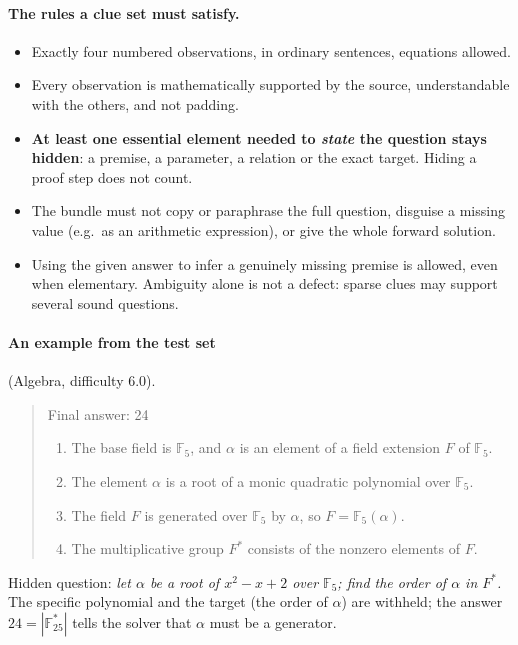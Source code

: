 \documentclass[11pt,a4paper]{article}
\begin{document}
\paragraph{The rules a clue set must satisfy.}
\begin{itemize}
\item Exactly four numbered observations, in ordinary sentences, equations allowed.
\item Every observation is mathematically supported by the source, understandable with the others, and not padding.
\item \textbf{At least one essential element needed to \emph{state} the question stays hidden}: a premise, a parameter, a relation or the exact target. Hiding a proof step does not count.
\item The bundle must not copy or paraphrase the full question, disguise a missing value (e.g.\ as an arithmetic expression), or give the whole forward solution.
\item Using the given answer to infer a genuinely missing premise is allowed, even when elementary. Ambiguity alone is not a defect: sparse clues may support several sound questions.
\end{itemize}

\paragraph{An example from the test set} (Algebra, difficulty 6.0).
\begin{quote}\small
Final answer: 24
\begin{enumerate}[label=\arabic*.]
\item The base field is $\mathbb{F}_5$, and $\alpha$ is an element of a field extension $F$ of $\mathbb{F}_5$.
\item The element $\alpha$ is a root of a monic quadratic polynomial over $\mathbb{F}_5$.
\item The field $F$ is generated over $\mathbb{F}_5$ by $\alpha$, so $F = \mathbb{F}_5(\alpha)$.
\item The multiplicative group $F^*$ consists of the nonzero elements of $F$.
\end{enumerate}
\end{quote}
Hidden question: \emph{let $\alpha$ be a root of $x^2 - x + 2$ over $\mathbb{F}_5$; find the order of $\alpha$ in $F^*$.} The specific polynomial and the target (the order of $\alpha$) are withheld; the answer $24 = |\mathbb{F}_{25}^*|$ tells the solver that $\alpha$ must be a generator.
\end{document}

